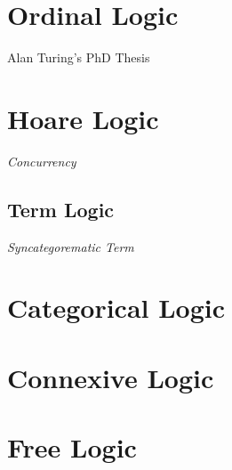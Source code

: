 \section{Ordinal Logic}\label{sec:ordinal_logic}

Alan Turing's PhD Thesis \cite{turing38}



\section{Hoare Logic}\label{sec:hoare_logic}

\emph{Concurrency}



\subsection{Term Logic}\label{sec:term_logic}

\emph{Syncategorematic Term}



\section{Categorical Logic}\label{sec:categorical_logic}



\section{Connexive Logic}\label{sec:connexive_logic}

\section{Free Logic}\label{sec:free_logic}

